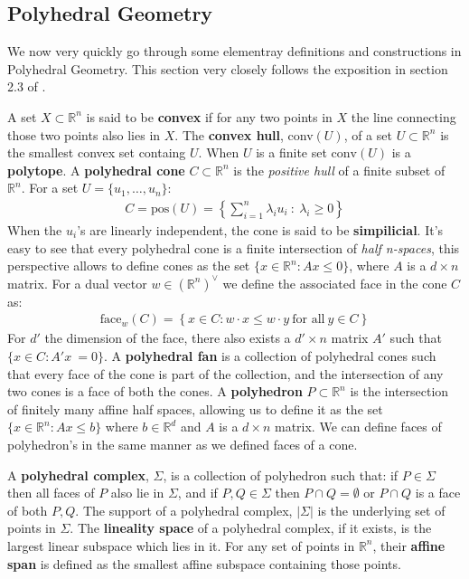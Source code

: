     \subsection{Polyhedral Geometry}
We now very quickly go through some elementray definitions and constructions in Polyhedral Geometry. 
This section very closely follows the exposition in section 2.3 of \cite{maclagan2015introduction}.
   \par A set $X\subset \mathbb{R}^{n}$ is said to be \textbf{convex} if for any two points in $X$ the line connecting those two points also lies in $X$. 
   The \textbf{convex hull}, conv$(U)$, of a set $U\subset \mathbb{R}^{n}$ is the smallest convex set containg $U$.
   When $U$ is a finite set $\text{conv}(U)$ is a \textbf{polytope}. 
   A \textbf{polyhedral cone} $C \subset \mathbb{R}^{n}$ is the \textit{positive hull} of a finite subset of $\mathbb{R}^{n}$. 
   For a set $U = \{u_1,\dots,u_n\}$:
   \begin{align*}
       C = \text{pos}(U) = \left\{\sum_{i=1}^{n}\lambda_i u_i~:~\lambda_i\geq 0\right\}
   \end{align*}
   When the $u_i$'s are linearly independent, the cone is said to be \textbf{simpilicial}. 
    It's easy to see that every polyhedral cone is a finite intersection of \textit{half n-spaces}, this perspective allows to define cones as the set $\{x \in \mathbb{R}^{n}: Ax\leq 0\}$, where $A$ is a $d \times n$ matrix. 
    For a dual vector $w \in (\mathbb{R}^{n})^{\vee}$ we define the associated face in the cone $C$ as:
    \begin{align*}
        \text{face}_{w}(C) = \left\{x \in C: w\cdot x \leq w\cdot y ~\text{for all}~y \in C\right\}
    \end{align*}
    For $d'$ the dimension of the face, there also exists a $d'\times n$ matrix $A'$ such that $\{x \in C: A'x\ =  0\}$. 
    A \textbf{polyhedral fan} is a collection of polyhedral cones such that every face of the cone is part of the collection, and the intersection of any two cones is a face of both the cones.
    A \textbf{polyhedron} $P \subset \mathbb{R}^{n}$ is the intersection of finitely many affine half spaces, allowing us to define it as the set $\{x \in \mathbb{R}^{n}: Ax\leq b\}$ where $b \in \mathbb{R}^{d}$ and $A$ is a $d \times n$ matrix. We can define faces of polyhedron's in the same manner as we defined faces of a cone.
    \par A \textbf{polyhedral complex}, $\Sigma$, is a collection of polyhedron such that: if $P \in \Sigma$ then all faces of $P$ also lie in $\Sigma$, and if $P,Q \in \Sigma$ then $P \cap Q = \emptyset$ or $P \cap Q$ is a face of both $P,Q$. The support of a polyhedral complex, $|\Sigma |$ is the underlying set of points in $\Sigma$. 
    The \textbf{lineality space} of a polyhedral complex, if it exists, is the largest linear subspace which lies in it.
    For any set of points in $\mathbb{R}^{n}$, their \textbf{affine span} is defined as the smallest affine subspace containing those points.

